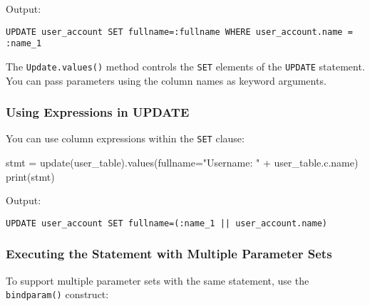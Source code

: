 \documentclass[
  letterpaper,
  DIV=11,
  numbers=noendperiod]{scrreprt}
\newenvironment{Shaded}{\begin{snugshade}}{\end{snugshade}}
\newcommand{\BuiltInTok}[1]{\textcolor[rgb]{0.00,0.23,0.31}{#1}}
\newcommand{\NormalTok}[1]{\textcolor[rgb]{0.00,0.23,0.31}{#1}}
\newcommand{\OperatorTok}[1]{\textcolor[rgb]{0.37,0.37,0.37}{#1}}
\newcommand{\StringTok}[1]{\textcolor[rgb]{0.13,0.47,0.30}{#1}}
\begin{document}
Output:

\begin{verbatim}
UPDATE user_account SET fullname=:fullname WHERE user_account.name = :name_1
\end{verbatim}

The \texttt{Update.values()} method controls the \texttt{SET} elements
of the \texttt{UPDATE} statement. You can pass parameters using the
column names as keyword arguments.

\subsubsection{Using Expressions in
UPDATE}\label{using-expressions-in-update}

You can use column expressions within the \texttt{SET} clause:

\begin{Shaded}
\begin{Highlighting}[]
\NormalTok{stmt }\OperatorTok{=}\NormalTok{ update(user\_table).values(fullname}\OperatorTok{=}\StringTok{"Username: "} \OperatorTok{+}\NormalTok{ user\_table.c.name)}
\BuiltInTok{print}\NormalTok{(stmt)}
\end{Highlighting}
\end{Shaded}

Output:

\begin{verbatim}
UPDATE user_account SET fullname=(:name_1 || user_account.name)
\end{verbatim}

\subsubsection{Executing the Statement with Multiple Parameter
Sets}\label{executing-the-statement-with-multiple-parameter-sets}

To support multiple parameter sets with the same statement, use the
\texttt{bindparam()} construct:
\end{document}

